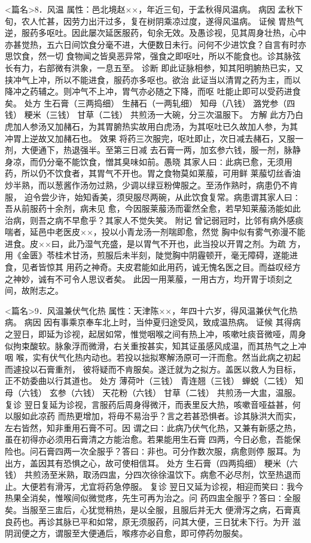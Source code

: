 \documentclass[a4paper,12pt,UTF8,twoside]{ctexbook}
\begin{document}
<篇名>8．风温
属性：邑北境赵××，年近三旬，于孟秋得风温病。 
病因 孟秋下旬，农人忙甚，因劳力出汗过多，复在树阴乘凉过度，遂得风温病。 
证候 胃热气逆，服药多呕吐。因此屡次延医服药，旬余无效。及愚诊视，见其周身壮热，心中 
亦甚觉热，五六日间饮食分毫不进，大便数日未行。问何不少进饮食？自言有时亦思饮食，然一切 
食物闻之皆臭恶异常，强食之即呕吐，所以不能食也。诊其脉弦长有力，右部微有洪象，一息五至。 
诊断 即此证脉相参，知其阳明腑热已实，又挟冲气上冲，所以不能进食，服药亦多呕也。欲治 
此证当以清胃之药为主，而以降冲之药辅之。则冲气不上冲，胃气亦必随之下降，而呕 
吐能止即可以受药进食矣。 
处方 生石膏（三两捣细） 生赭石（一两轧细） 知母（八钱） 潞党参（四钱） 
粳米（三钱） 甘草（二钱） 
共煎汤一大碗，分三次温服下。 
方解 此方乃白虎加人参汤又加赭石，为其胃腑热实故用白虎汤，为其呕吐已久故加人参，为其 
冲胃上逆故又加赭石也。 
效果 将药三次服完，呕吐即止，次日减去赭石，又服一剂，大便通下，热退强半。至第三日减 
去石膏一两，加玄参六钱，服一剂，脉静身凉，而仍分毫不能饮食，憎其臭味如前。愚晓 
其家人曰∶此病已愈，无须用药，所以仍不饮食者，其胃气不开也。胃之食物莫如莱菔，可用鲜 
莱菔切丝香油炒半熟，而以葱酱作汤勿过熟，少调以绿豆粉俾服之。至汤作熟时，病患仍不肯服， 
迫令尝少许，始知香美，须臾服尽两碗，从此饮食复常。病患谓其家人曰∶吾从前服药十余剂，病未见 
愈，今因服莱菔汤而霍然全愈，若早知莱菔汤能如此治病，则吾之病不早愈乎？其家人不觉失笑。 
附记 曾记弱冠时，比邻有病外感痰喘者，延邑中老医皮××，投以小青龙汤一剂喘即愈，然觉 
胸中似有雾气弥漫不能进食。皮××曰，此乃湿气充盛，是以胃气不开也，此当投以开胃之剂。为疏 
方，用《金匮》苓桂术甘汤，煎服后未半刻，陡觉胸中阴霾顿开，毫无障碍，遂能进食，见者皆惊其 
用药之神奇。夫皮君能如此用药，诚无愧名医之目。而益叹经方之神妙，诚有不可令人思议者矣。 
此因一用莱菔，一用古方，均开胃于顷刻之间，故附志之。 


<篇名>9．风温兼伏气化热
属性：天津陈××，年四十六岁，得风温兼伏气化热病。 
病因 因有事乘京奉车北上时，当仲夏归途受风，致成温热病。 
证候 其得病之翌日，即延为诊视，起居如常，惟觉咽喉之间有热上冲，咳嗽吐痰音微哑，周身 
似拘束酸软。脉象浮而微滑，右关重按甚实，知其证虽感风成温，而其热气之上冲咽 
喉，实有伏气化热内动也。若投以拙拟寒解汤原可一汗而愈。然当此病之初起而遽投以石膏重剂， 
彼将疑而不肯服矣。遂迁就为之拟方。盖医以救人为目标，正不妨委曲以行其道也。 
处方 薄荷叶（三钱） 青连翘（三钱） 蝉蜕（二钱） 知母（六钱） 
玄参（六钱） 天花粉（六钱） 甘草（二钱） 
共煎汤一大盅，温服。 
复诊 翌日复延为诊视，言服药后周身得微汗，而表里反大热，咳嗽音哑益甚，何以服如此凉药 
而热更增加，将毋不易治乎？言之若甚恐惧者。诊其脉洪大而实，左右皆然，知非重用石膏不可。因 
谓之曰∶此病乃伏气化热，又兼有新感之热，虽在初得亦必须用石膏清之方能治愈。若果能用生石膏 
四两，今日必愈，吾能保险也。问石膏四两一次全服乎？答曰∶非也。可分作数次服，病愈则停 
服耳。为出方，盖因其有恐惧之心，故可使相信耳。 
处方 生石膏（四两捣细） 粳米（六钱） 
共煎汤至米熟，取汤四盅，分四次徐徐温饮下。病愈不必尽剂，饮至热退而止。大便若有滑泻，尤宜将药急停服。 
复诊 翌日又延为诊视，相迎而笑曰∶我今热果全消矣，惟喉间似微觉疼，先生可再为治之。问 
药四盅全服乎？答曰∶全服矣。当服至三盅后，心犹觉稍热，是以全服，且服后并无大 
便滑泻之病，石膏真良药也。再诊其脉已平和如常，原无须服药，问其大便，三日犹未下行。为开 
滋阴润便之方，谓服至大便通后，喉疼亦必自愈，即可停药勿服矣。 
\end{document}
